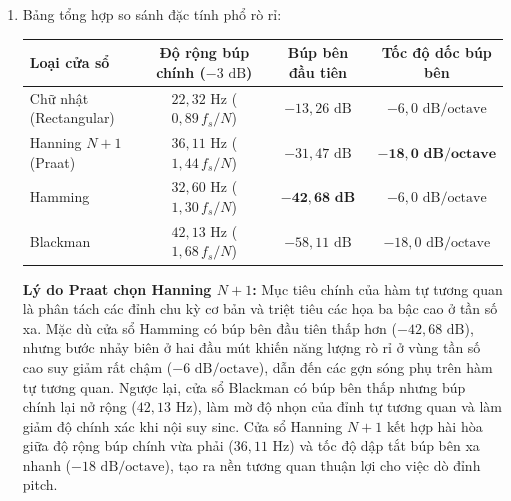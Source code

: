 \begin{enumerate}[label=(\alph*)]
    \item Bảng tổng hợp so sánh đặc tính phổ rò rỉ:
    \begin{center}
    \small
    \begin{tabular}{lccc}
    \toprule
    \textbf{Loại cửa sổ} & \textbf{Độ rộng búp chính ($-3\text{ dB}$)} & \textbf{Búp bên đầu tiên} & \textbf{Tốc độ dốc búp bên} \\
    \midrule
    Chữ nhật (Rectangular) & $22{,}32\text{ Hz}$ ($0{,}89\,f_s/N$) & $-13{,}26\text{ dB}$ & $-6{,}0\text{ dB/octave}$ \\
    Hanning $N+1$ (Praat)  & $36{,}11\text{ Hz}$ ($1{,}44\,f_s/N$) & $-31{,}47\text{ dB}$ & $\mathbf{-18{,}0\text{ dB/octave}}$ \\
    Hamming                & $32{,}60\text{ Hz}$ ($1{,}30\,f_s/N$) & $\mathbf{-42{,}68\text{ dB}}$ & $-6{,}0\text{ dB/octave}$ \\
    Blackman               & $42{,}13\text{ Hz}$ ($1{,}68\,f_s/N$) & $-58{,}11\text{ dB}$ & $-18{,}0\text{ dB/octave}$ \\
    \bottomrule
    \end{tabular}
    \end{center}

    \textbf{Lý do Praat chọn Hanning $N+1$:} 
    Mục tiêu chính của hàm tự tương quan là phân tách các đỉnh chu kỳ cơ bản và triệt tiêu các họa ba bậc cao ở tần số xa. 
    Mặc dù cửa sổ Hamming có búp bên đầu tiên thấp hơn ($-42{,}68\text{ dB}$), nhưng bước nhảy biên ở hai đầu mút khiến năng lượng rò rỉ ở vùng tần số cao suy giảm rất chậm ($-6\text{ dB/octave}$), dẫn đến các gợn sóng phụ trên hàm tự tương quan. 
    Ngược lại, cửa sổ Blackman có búp bên thấp nhưng búp chính lại nở rộng ($42{,}13\text{ Hz}$), làm mờ độ nhọn của đỉnh tự tương quan và làm giảm độ chính xác khi nội suy sinc. 
    Cửa sổ Hanning $N+1$ kết hợp hài hòa giữa độ rộng búp chính vừa phải ($36{,}11\text{ Hz}$) và tốc độ dập tắt búp bên xa nhanh ($-18\text{ dB/octave}$), tạo ra nền tương quan thuận lợi cho việc dò đỉnh pitch.
\end{enumerate}

